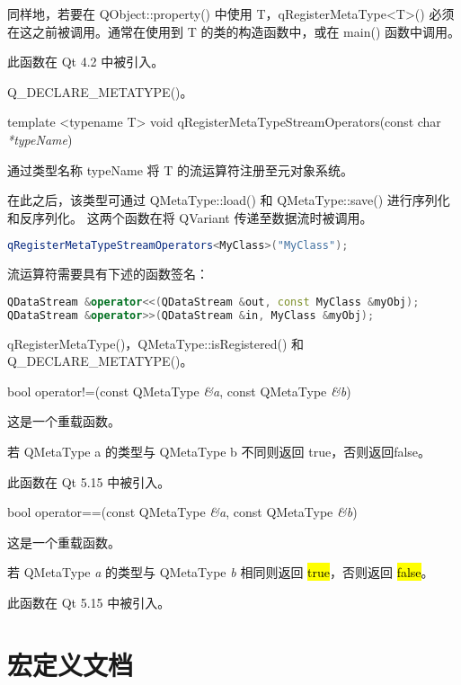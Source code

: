 同样地，若要在 QObject::property() 中使用 T，qRegisterMetaType<T>() 必须在这之前被调用。通常在使用到 T 的类的构造函数中，或在 main() 函数中调用。

此函数在 Qt 4.2 中被引入。

\begin{seeAlso}
Q\_DECLARE\_METATYPE()。
\end{seeAlso}

template <typename T> void qRegisterMetaTypeStreamOperators(const char \emph{*typeName})

通过类型名称 typeName 将 T 的流运算符注册至元对象系统。

在此之后，该类型可通过 QMetaType::load() 和 QMetaType::save() 进行序列化和反序列化。
这两个函数在将 QVariant 传递至数据流时被调用。

\begin{lstlisting}[language=C++]
qRegisterMetaTypeStreamOperators<MyClass>("MyClass");
\end{lstlisting}

流运算符需要具有下述的函数签名：

\begin{lstlisting}[language=C++]
QDataStream &operator<<(QDataStream &out, const MyClass &myObj);
QDataStream &operator>>(QDataStream &in, MyClass &myObj);
\end{lstlisting}


\begin{seeAlso}
qRegisterMetaType()，QMetaType::isRegistered() 和 Q\_DECLARE\_METATYPE()。
\end{seeAlso}

bool operator!=(const QMetaType \emph{\&a}, const QMetaType \emph{\&b})

这是一个重载函数。

若 QMetaType a 的类型与 QMetaType b 不同则返回 true，否则返回false。

此函数在 Qt 5.15 中被引入。

bool operator==(const QMetaType \emph{\&a}, const QMetaType \emph{\&b})

这是一个重载函数。

若 QMetaType \emph{a} 的类型与 QMetaType \emph{b} 相同则返回 \hl{true}，否则返回 \hl{false}。

此函数在 Qt 5.15 中被引入。



\section{宏定义文档}

